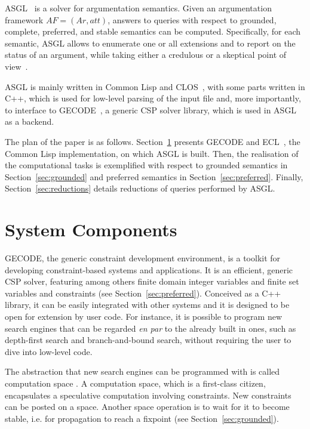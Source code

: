 \documentclass[runningheads,a4paper]{llncs}
\begin{document}
ASGL~\cite{asgl} is a solver for argumentation semantics. Given an
argumentation framework $AF = (Ar, att)$, answers to queries with
respect to grounded, complete, preferred, and stable semantics can be
computed. Specifically, for each semantic, ASGL allows to enumerate
one or all extensions and to report on the status of an argument,
while taking either a credulous or a skeptical point of
view~\cite{Modgil2009}.

ASGL is mainly written in Common Lisp and CLOS~\cite{Steele:1990:CLL},
with some parts written in C++, which is used for low-level parsing of
the input file and, more importantly, to interface to
GECODE~\cite{gecode}, a generic CSP solver library, which is used in
ASGL as a backend.

The plan of the paper is as follows. Section~\ref{sec:components}
presents GECODE and ECL~\cite{ecl}, the Common Lisp implementation, on
which ASGL is built. Then, the realisation of the computational tasks
is exemplified with respect to grounded semantics in
Section~\ref{sec:grounded} and preferred semantics in
Section~\ref{sec:preferred}. Finally, Section~\ref{sec:reductions}
details reductions of queries performed by ASGL.
\section{System Components}\label{sec:components}

GECODE, the generic constraint development environment, is a toolkit
for developing constraint-based systems and applications. It is an
efficient, generic CSP solver, featuring among others finite domain
integer variables and finite set variables and constraints (see
Section~\ref{sec:preferred}). Conceived as a C++ library, it can be
easily integrated with other systems and it is designed to be open for
extension by user code.  For instance, it is possible to program new
search engines that can be regarded \textit{en par} to the already
built in ones, such as depth-first search and branch-and-bound search,
without requiring the user to dive into low-level code.

The abstraction that new search engines can be programmed with is
called computation space \cite{Engines:97}. A computation space, which
is a first-class citizen, encapsulates a speculative computation
involving constraints. New constraints can be posted on a
space. Another space operation is to wait for it to become stable,
i.e. for propagation to reach a fixpoint (see
Section~\ref{sec:grounded}).
\end{document}
